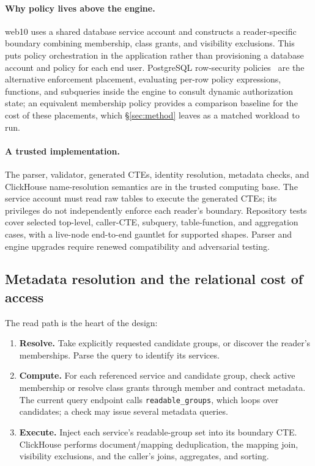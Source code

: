 \documentclass[sigconf, nonacm]{acmart}
\begin{document}
\paragraph{Why policy lives above the engine.} web10 uses a shared database
service account and constructs a reader-specific boundary combining
membership, class grants, and visibility exclusions. This puts policy
orchestration in the application rather than provisioning a database
account and policy for each end user. PostgreSQL row-security
policies~\cite{postgres-rls} are the alternative enforcement placement,
evaluating per-row policy expressions, functions, and subqueries inside the
engine to consult dynamic authorization state; an equivalent membership
policy provides a comparison baseline for the cost of these placements,
which \S\ref{sec:method} leaves as a matched workload to run.

\paragraph{A trusted implementation.} The parser, validator, generated CTEs,
identity resolution, metadata checks, and ClickHouse name-resolution
semantics are in the trusted computing base. The service account must read
raw tables to execute the generated CTEs; its privileges do not
independently enforce each reader's boundary. Repository tests cover
selected top-level, caller-CTE, subquery, table-function, and aggregation
cases, with a live-node end-to-end gauntlet for supported shapes. Parser and
engine upgrades require renewed compatibility and adversarial testing.

\subsection{Metadata resolution and the relational cost of access}

The read path is the heart of the design:

\begin{enumerate}[leftmargin=*,nosep]
  \item \textbf{Resolve.} Take explicitly requested candidate groups, or
  discover the reader's memberships. Parse the query to identify its
  services.
  \item \textbf{Compute.} For each referenced service and candidate group,
  check active membership or resolve class grants through member and
  contract metadata. The current query endpoint calls
  \texttt{readable\_groups}, which loops over candidates; a check may issue
  several metadata queries.
  \item \textbf{Execute.} Inject each service's readable-group set into its
  boundary CTE. ClickHouse performs document/mapping deduplication, the
  mapping join, visibility exclusions, and the caller's joins, aggregates,
  and sorting.
\end{enumerate}
\end{document}

